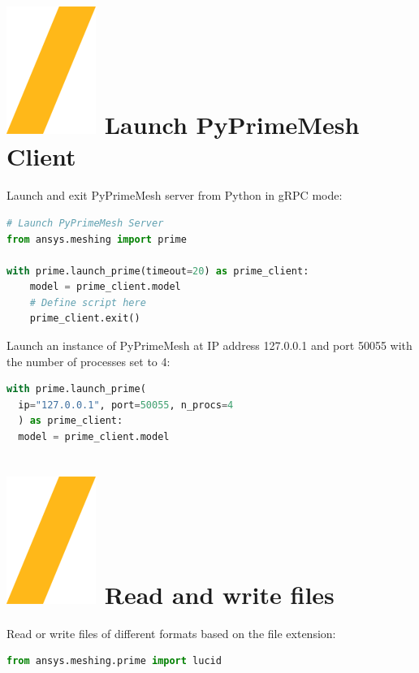 \documentclass[9pt,landscape]{article}
\begin{document}
\begin{multicols}{3}
\setlength{\premulticols}{1pt}
\setlength{\postmulticols}{1pt}
\setlength{\multicolsep}{1pt}
\setlength{\columnsep}{2pt}

\vfill
\section{\includegraphics[height=\fontcharht\font`\S]{slash.png} Launch PyPrimeMesh Client}
Launch and exit PyPrimeMesh server from Python in gRPC mode:\\
\begin{lstlisting}[language=Python]
# Launch PyPrimeMesh Server 
from ansys.meshing import prime

with prime.launch_prime(timeout=20) as prime_client:
    model = prime_client.model
    # Define script here
    prime_client.exit()
\end{lstlisting}

Launch an instance of PyPrimeMesh at IP address
127.0.0.1 and port 50055 with the number of processes set to 4:
\begin{lstlisting}[language=Python]
with prime.launch_prime(
  ip="127.0.0.1", port=50055, n_procs=4
  ) as prime_client:
  model = prime_client.model
\end{lstlisting}

\section{\includegraphics[height=\fontcharht\font`\S]{slash.png} Read and write files }
Read or write files of different formats based on the file extension:\\
\begin{lstlisting}[language=Python]
from ansys.meshing.prime import lucid


\end{lstlisting}
\end{multicols}
\end{document}
